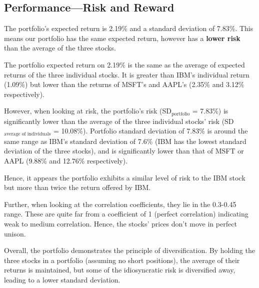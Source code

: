\documentclass[12pt]{article}
\begin{document}
\subsection{Performance---Risk and Reward}
The portfolio's expected return is 2.19\% and a standard deviation of 7.83\%. This means our portfolio has the same expected return, however has a \textbf{lower risk} than the average of the three stocks.

The portfolio expected return on 2.19\% is the same as the average of expected returns of the three individual stocks. It is greater than IBM's individual return (1.09\%) but lower than the returns of MSFT's and AAPL's (2.35\% and 3.12\% respectively). 

However, when looking at risk, the portfolio's risk (SD$_{\text{portfolio}}$ = 7.83\%) is significantly lower than the average of the three individual stocks' risk (SD$_{\text{average of individuals}}$ = 10.08\%). Portfolio standard deviation of 7.83\% is around the same range as IBM's standard deviation of 7.6\% (IBM has the lowest standard deviation of the three stocks), and is significantly lower than that of MSFT or AAPL (9.88\% and 12.76\% respectively).

Hence, it appears the portfolio exhibits a similar level of risk to the IBM stock but more than twice the return offered by IBM.

Further, when looking at the correlation coefficients, they lie in the 0.3-0.45 range. These are quite far from a coefficient of 1 (perfect correlation) indicating weak to medium correlation. Hence, the stocks' prices don't move in perfect unison.

Overall, the portfolio demonstrates the principle of diversification. By holding the three stocks in a portfolio (assuming no short positions), the average of their returns is maintained, but some of the idiosyncratic risk is diversified away, leading to a lower standard deviation.
\end{document}
